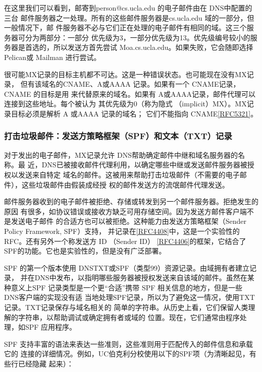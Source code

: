 在这里我们可以看到，邮寄到person@cs.ucla.edu 的电子邮件由在 DNS中配置的三台
邮件服务器之一处理。所有的这些邮件服务器是cs.ucla.edu 域的一部分，但一般情况下，邮
件服务器不必与它们正在处理的电子邮件有相同的域。这三个服务器可分为两部分：一部分
优先级为3，一部分优先级为13。优先级编号较小的服务器是首选的，所以发送方首先尝试
Moa.cs.ucla.edu。如果失败，它会随即选择 Pelican或 Mailman 进行尝试。

很可能MX记录的目标主机都不可达。这是一种错误状态。也可能现在没有MX记录，
但有该域名的CNAME、A或AAAA 记录。如果有一个 CNAME记录，CNAME 的目标是用
来代替原来的域名。如果有 A或AAAA记录，邮件代理可以连接到这些地址。每个被认为
其优先级为0（称为隐式 （implicit）MX）。MX记录目标必须是解析 A 或AAAA 记录的域名；
它们不能指向 CNAME\href{https://www.rfc-editor.org/rfc/rfc5321}{[RFC5321]}。

\subsubsection{打击垃圾邮件：发送方策略框架（SPF）和文本（TXT）记录}

对于发出的电子邮件，MX记录允许 DNS帮助确定邮件中继和域名服务器的名称。最
近，DNS已被接收邮件代理利用，以确定哪些中继或发送邮件服务器被授权以发送来自特定
域名的邮件。这被用来帮助打击垃圾邮件（不需要的电子邮件），这些垃圾邮件由假装成经授
权的邮件发送方的流氓邮件代理发送。

邮件服务器收到的电子邮件被拒绝、存储或转发到另一个邮件服务器。拒绝发生的原因
有很多，如协议错误或接收方缺乏可用存储空间。因为发送方邮件客户端不是发送电子邮件
的合适方也可以被拒绝。这种能力由发送方策略框架（Sender Policy Framework, SPF）支持，
并记录在\href{https://www.rfc-editor.org/rfc/rfc4408}{[RFC4408]}中，这是一个实验性的 RFC。还有另外一个称发送方 ID （Sender ID）
\href{https://www.rfc-editor.org/rfc/rfc4406}{[RFC4406]}的框架，它结合了 SPF的功能。它也是实验性的，但是没有广泛部署。

SPF 的第一个版本使用 DNSTXT或SPF（类型99）资源记录。由域拥有者建立记录，
并在DNS中发布，以指明哪些服务器被授权发送来自该域的邮件。虽然在某种意义上SPF
记录类型是一个更“合适”携带 SPF 相关信息的地方，但是一些 DNS客户端的实现没有适
当地处理SPF记录，所以为了避免这一情况，使用TXT记录。TXT记录保存与域名相关的
简单的字符串。从历史上看，它们保留人类理解的字符串，以帮助调试或确定拥有者或域的
位置。现在，它们通常由程序处理，如SPF 应用程序。

SPF 支持丰富的语法来表达一些准则，这些准则用于匹配传入的邮件信息和承载它的
连接的详细情况。例如，UC伯克利分校使用以下的SPF项（为清晰起见，有些行已经隐藏
起来）：

